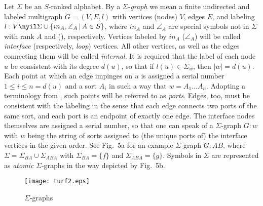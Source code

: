 \documentclass{eptcs}
\begin{document}
Let $\Sigma $ be an $S$-ranked alphabet. By a $\Sigma $-{\em graph\/} we mean a
finite undirected and labeled multigraph $G=(V,E,l)$ with vertices (nodes) $V$, edges $E$, and
labeling $l:V\nyil \Sigma \cup \{ in _A, \angle _A\,|\, A\in S\}$, where $in _A$ and
$\angle _A$ are special symbols not in $\Sigma $ with rank $A$ and (), respectively.
Vertices labeled by $in _A$ ($\angle _A$) will be called {\em interface\/} (respectively,
{\em loop\/}) vertices. All other vertices, as well as the edges connecting them will be 
called {\em internal\/}. It is required that the label of each node $u$ be consistent 
with its degree $d(u)$, so that if $l(u)\in \Sigma _w$, then $|w|= d(u)$. Each point at which 
an edge impinges on $u$ is assigned a serial number $1\leq i\leq n=d(u)$ and a sort
$A_i$ in such a way that $w=A_1\ldots A_n$. Adopting a terminology from \cite
{tcs,mil}, such points will be referred to as {\em ports}. Edges, too,
must be consistent with the labeling in the sense that each edge connects two
ports of the same sort, and each port is  an endpoint of exactly one edge. The
interface nodes themselves are assigned a serial number, so that one can speak
of a $\Sigma $-graph $G:w$ with $w$ being the string of sorts assigned to (the
unique ports of) the interface vertices in the given order. See Fig.~5a for an
example  $\Sigma $ graph $G:AB$, where $\Sigma =\Sigma _{BA}\cup \Sigma
_{ABA}$ with $\Sigma _{BA}=\{ f\}$ and $\Sigma _{ABA}=\{ g\}$. Symbols in
$\Sigma $ are represented as {\em atomic\/} $\Sigma $-graphs in the way
depicted by Fig.~5b. 
\begin{figure}[h]
\begin{center} 
\texttt{[image: turf2.eps]}
\end{center}
\vspmini
\caption{$\Sigma $-graphs}
\vspmini
\end{figure}
\end{document}

